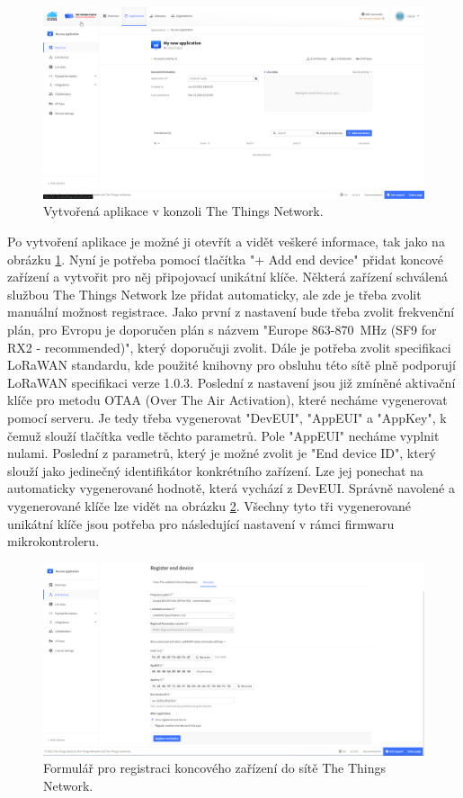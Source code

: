 \begin{figure}[h]
    \centering
    \includegraphics[width=\textwidth]{obrazky/ttnApps.png}
    \caption{Vytvořená aplikace v konzoli The Things Network.}
    \label{fig_TTNApp}
\end{figure}

Po vytvoření aplikace je možné ji otevřít a vidět veškeré informace, tak jako na obrázku \ref{fig_TTNApp}. Nyní je potřeba pomocí tlačítka "+ Add end device"{} přidat koncové zařízení a vytvořit pro něj připojovací unikátní klíče. Některá zařízení schválená službou The Things Network lze přidat automaticky, ale zde je třeba zvolit manuální možnost registrace. Jako první z nastavení bude třeba zvolit frekvenční plán, pro Evropu je doporučen plán s názvem "Europe 863-870~MHz (SF9 for RX2 - recommended)", který doporučuji zvolit. Dále je potřeba zvolit specifikaci LoRaWAN standardu, kde použité knihovny pro obsluhu této sítě plně podporují LoRaWAN specifikaci verze 1.0.3. Poslední z nastavení jsou již zmíněné aktivační klíče pro metodu OTAA (Over The Air Activation), které necháme vygenerovat pomocí serveru. Je tedy třeba vygenerovat "DevEUI", "AppEUI"{} a "AppKey", k čemuž slouží tlačítka vedle těchto parametrů. Pole "AppEUI"{} necháme vyplnit nulami. Poslední z parametrů, který je možné zvolit je "End device ID", který slouží jako jedinečný identifikátor konkrétního zařízení. Lze jej ponechat na automaticky vygenerované hodnotě, která vychází z DevEUI. Správně navolené a vygenerované klíče lze vidět na obrázku \ref{fig_TTNDeviceGeneration}. Všechny tyto tři vygenerované unikátní klíče jsou potřeba pro následující nastavení v rámci firmwaru mikrokontroleru.

\begin{figure}[h]
    \centering
    \includegraphics[width=\textwidth]{obrazky/ttnDeviceRegister.png}
    \caption{Formulář pro registraci koncového zařízení do sítě The Things Network.}
    \label{fig_TTNDeviceGeneration}
\end{figure}

